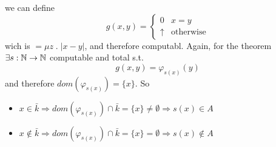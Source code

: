 \begin{counterexample}
\begin{enumerate}
    we can define
    \[
      g(x,y) = \begin{cases}
        0        & x=y \\
        \uparrow & \mbox{otherwise}
      \end{cases}
    \]
    wich is $= \mu z \; . \; |x-y|$, and therefore computabl. Again,
    for the \smn theorem $\exists s : \mathbb{N} \rightarrow \mathbb{N}$ computable and total
    s.t.
    \[
      g(x,y) = \varphi_{s(x)}(y)
    \]
    and therefore $dom(\varphi_{s(x)}) = \{x\}$. So
    \begin{itemize}
    \item
      \(x \in \bar{k} \Rightarrow dom(\varphi_{s(x)}) \cap \bar{k} =
      \{x\} \neq \emptyset \Rightarrow s(x) \in A\)
    \item
      \(x \notin \bar{k} \Rightarrow dom(\varphi_{s(x)}) \cap \bar{k}
      = \{x\} = \emptyset \Rightarrow s(x) \notin A\)
    \end{itemize}
  \end{enumerate}
\end{counterexample}